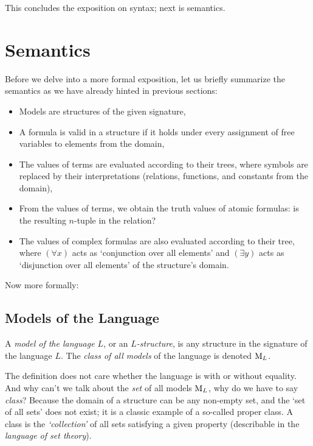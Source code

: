This concludes the exposition on syntax; next is semantics.


\section{Semantics}\label{section:predicate-semantics}

Before we delve into a more formal exposition, let us briefly summarize the semantics as we have already hinted in previous sections:

\begin{itemize}
    \item Models are structures of the given signature,
    \item A formula is valid in a structure if it holds under every assignment of free variables to elements from the domain,
    \item The values of terms are evaluated according to their trees, where symbols are replaced by their interpretations (relations, functions, and constants from the domain),
    \item From the values of terms, we obtain the truth values of atomic formulas: is the resulting $n$-tuple in the relation?
    \item The values of complex formulas are also evaluated according to their tree, where $(\forall x)$ acts as `conjunction over all elements' and $(\exists y)$ acts as `disjunction over all elements' of the structure's domain.
\end{itemize}

Now more formally:

\subsection{Models of the Language}

\begin{definition}
A \emph{model of the language $L$}, or an \emph{$L$-structure}, is any structure in the signature of the language $L$. The \emph{class of all models} of the language is denoted $\operatorname{M}_L$.
\end{definition}

\begin{remark}
The definition does not care whether the language is with or without equality. And why can't we talk about the \emph{set} of all models $\operatorname{M}_L$, why do we have to say \emph{class}? Because the domain of a structure can be any non-empty set, and the `set of all sets' does not exist; it is a classic example of a so-called proper class. A class is the \emph{`collection'} of all sets satisfying a given property (describable in the \emph{language of set theory}).
\end{remark}

